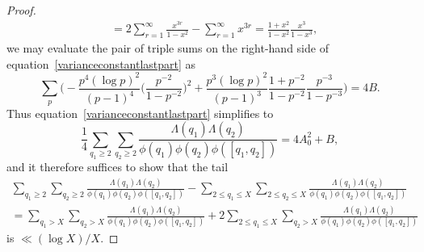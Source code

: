\documentclass[12pt,reqno]{amsart}
\theoremstyle{definition}
\begin{document}
\begin{proof}
\begin{align*}
&= 2 \sum_{r=1}^\infty \frac{x^{3r}}{1 - x^2} - \sum_{r=1}^\infty x^{3r} = \frac{1+x^2}{1-x^2} \frac{x^3}{1-x^3},
\end{align*}
we may evaluate the pair of triple sums on the right-hand side of equation~\eqref{varianceconstantlastpart} as
\begin{equation*}
\sum_p \bigg( {-} \frac{p^4(\log p)^2}{(p-1)^4} \bigg( \frac{p^{-2}}{1-p^{-2}} \bigg)^2 + \frac{p^3(\log p)^2} {(p-1)^3} \frac{1+p^{-2}}{1-p^{-2}} \frac{p^{-3}}{1-p^{-3}} \bigg) = 4B.
\end{equation*}
Thus equation~\eqref{varianceconstantlastpart} simplifies to
\[
\frac{1}{4} \sum_{q_1\ge2}\sum_{q_2\ge2} \frac{\Lambda(q_1)\Lambda(q_2)}{\phi(q_1)\phi(q_2)\phi([q_1, q_2])} = 4A_0^2 + B,
\]
and it therefore suffices to show that the tail
\begin{multline}
\sum_{q_1\ge2}\sum_{q_2\ge2} \frac{\Lambda(q_1)\Lambda(q_2)}{\phi(q_1)\phi(q_2)\phi([q_1, q_2])} - \sum_{2 \leq q_1 \leq X}\sum_{2 \leq q_2 \leq X} \frac{\Lambda(q_1)\Lambda(q_2)}{\phi(q_1)\phi(q_2)\phi([q_1, q_2])} \\
= \sum_{q_1>X}\sum_{q_2>X} \frac{\Lambda(q_1)\Lambda(q_2)}{\phi(q_1)\phi(q_2)\phi([q_1, q_2])} + 2\sum_{2 \leq q_1 \leq X} \sum_{q_2 > X} \frac{\Lambda(q_1)\Lambda(q_2)}{\phi(q_1)\phi(q_2)\phi([q_1, q_2])}  \label{double sum tail}
\end{multline}
is $\ll (\log X)/X$.


\end{proof}
\end{document}
